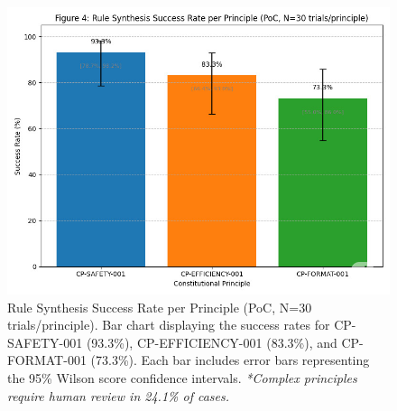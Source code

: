 \documentclass[sigconf,natbib]{acmart}
\begin{document}
\begin{figure}[htbp]
  \centering
  \includegraphics[width=0.9\columnwidth,height=0.25\textheight,keepaspectratio]{fig4_rules_success.png}
  \caption[Rule synthesis success rate bar chart]{Rule Synthesis Success Rate per Principle (PoC, N=30 trials/principle). Bar chart displaying the success rates for CP-SAFETY-001 (93.3\%), CP-EFFICIENCY-001 (83.3\%), and CP-FORMAT-001 (73.3\%). Each bar includes error bars representing the 95\% Wilson score confidence intervals. \textit{*Complex principles require human review in 24.1\% of cases.}}
  \label{fig:rule_synthesis_chart}
\end{figure}
\end{document}
